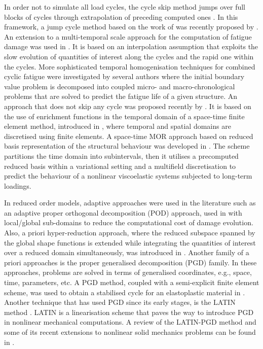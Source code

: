 In order not to simulate all load cycles, the cycle skip method jumps over full blocks of cycles through extrapolation of preceding computed ones \parencite{damage_90,lemaitre2005engineering}. In this framework, a jump cycle method based on the work of \parencite{burlon2014skipped} was recently proposed by \parencite{zerbe2016viscoelastic}. An extension to a multi-temporal scale approach for the computation of fatigue damage was used in \parencite{bha2018temporal}. It is based on an interpolation assumption that exploits the slow evolution of quantities of interest along the cycles and the rapid one within the cycles. More sophisticated temporal homogenisation techniques for combined cyclic fatigue were investigated by several authors \parencite{fish2002computational,oskay2004fatigue,devulder2010two,haouala2015modeling} where the initial boundary value problem is decomposed into coupled micro- and macro-chronological problems that are solved to predict the fatigue life of a given structure. An approach that does not skip any cycle was proposed recently by \parencite{bhamare}. It is based on the use of enrichment functions in the temporal domain of a space-time finite element method, introduced in \parencite{oden1969general,fried1969finite,argyris1969finite}, where temporal and spatial domains are discretised using finite elements. A space-time MOR approach based on reduced basis representation of the structural behaviour was developed in \parencite{fritzen2018space}. The scheme partitions the time domain into subintervals, then it utilises a precomputed reduced basis within a variational setting and a multifield discretisation to predict the behaviour of a nonlinear viscoelastic systems subjected to long-term loadings.

In reduced order models, adaptive approaches were used in the literature such as an adaptive proper orthogonal decomposition (POD) approach, used in \parencite{kerfriden2011bridging,kerfriden2012local} with local/global sub-domains to reduce the computational cost of damage evolution. Also, a priori hyper-reduction approach, where the reduced subspace spanned by the global shape functions is extended while integrating the quantities of interest over a reduced domain simultaneously, was introduced in \parencite{ryckelynck2005priori,Ryckelynck2011}. Another family of a priori approaches is the proper generalised decomposition (PGD) family. In these approaches, problems are solved in terms of generalised coordinates, e.g., space, time, parameters, etc. A PGD method, coupled with a semi-explicit finite element scheme, was used to obtain a stabilised cycle for an elastoplastic material in \parencite{nasri2018proper}. Another technique that has used PGD since its early stages, is the LATIN method \parencite{lad1999}. LATIN is a linearisation scheme that paves the way to introduce PGD in nonlinear mechanical computations. A review of the LATIN-PGD method and some of its recent extensions to nonlinear solid mechanics problems can be found in \parencite{Ladeveze2016227,chinesta2014separated}.

